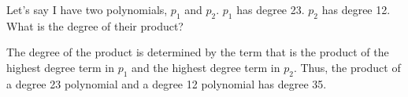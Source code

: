 \begin{Exercise}[title={Observations}, label=obsmultpoly]
  Let's say I have two polynomials, $p_1$ and $p_2$.  $p_1$ has degree 23.  $p_2$ has degree 12.  What is the degree of their product?
\end{Exercise}
\begin{Answer}[ref=obsmultpoly]
  The degree of the product is determined by the term that is the
  product of the highest degree term in $p_1$ and the highest degree
  term in $p_2$. Thus, the product of a degree 23 polynomial and a
  degree 12 polynomial has degree 35.
\end{Answer}
  

